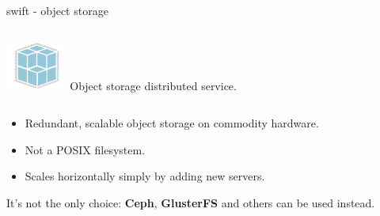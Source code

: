 \documentclass[english,serif,mathserif,usenames,dvipsnames]{beamer}
\begin{document}
\begin{frame}
  {swift - object storage}
  \begin{columns}
    \column{2cm}
    \includegraphics[width=2cm]{openstack-object-storage-icon.png}
    \column{8cm}
    Object storage distributed service.
  \end{columns}
  
  \+\+
  \begin{itemize}
  \item Redundant, scalable object storage on commodity hardware.
  \item Not a POSIX filesystem.
  \item Scales horizontally simply by adding new servers.
  \end{itemize}

  \+ It's not the only choice: \textbf{Ceph}, \textbf{GlusterFS} and
  others can be used instead.

\end{frame}
\end{document}
